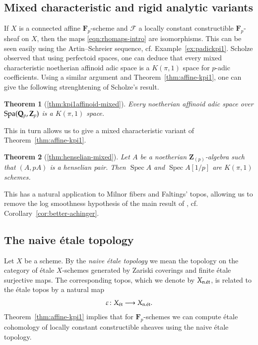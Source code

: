 \documentclass[twoside]{amsart}
\newcommand{\FF}{\mathbf{F}}
\newcommand{\QQ}{\mathbf{Q}}
\newcommand{\ZZ}{\mathbf{Z}}
\newcommand{\Ff}{\mathscr{F}}
\newcommand{\et}{{\rm\acute{e}t}}
\DeclareMathOperator{\Spec}{Spec}
\renewcommand{\to}{\longrightarrow}
\theoremstyle{plain}
\newtheorem*{theorem*}{Theorem}
\theoremstyle{definition}
\theoremstyle{remark}
\numberwithin{equation}{subsection}
\begin{document}
\subsection{Mixed characteristic and rigid analytic variants}

If $X$ is a connected affine $\FF_p$-scheme and $\Ff$ a locally constant constructible $\FF_p$-sheaf on $X$, then the maps \eqref{eqn:rhomaps-intro} are isomorphisms. This can be seen easily using the Artin--Schreier sequence, cf. Example~\ref{ex:padickpi1}. Scholze \cite[Theorem~4.9]{ScholzePAdic} observed that using perfectoid spaces, one can deduce that every mixed characteristic noetherian affinoid adic space is a $K(\pi, 1)$ space for $p$-adic coefficients. Using a similar argument and Theorem~\ref{thm:affine-kpi1}, one can give the following strenghtening of Scholze's result.

\begin{theorem*}[\ref{thm:kpi1affinoid-mixed}]
	Every noetherian affinoid adic space over ${\rm Spa}(\QQ_p, \ZZ_p)$ is a $K(\pi, 1)$ space. 
\end{theorem*}

This in turn allows us to give a mixed characteristic variant of Theorem~\ref{thm:affine-kpi1}.

\begin{theorem*}[\ref{thm:henselian-mixed}]
	Let $A$ be a noetherian $\ZZ_{(p)}$-algebra such that $(A, pA)$ is a henselian pair. Then $\Spec A$ and $\Spec A[1/p]$ are $K(\pi, 1)$ schemes.
\end{theorem*}

This has a natural application to Milnor fibers and Faltings' topos, allowing us to remove the log smoothness hypothesis of the main result of \cite{Achinger}, cf. Corollary~\ref{cor:better-achinger}.

\subsection{The naive \'etale topology}

Let $X$ be a scheme. By the \emph{naive \'etale topology} we mean the topology on the category of \'etale $X$-schemes generated by Zariski coverings and finite \'etale surjective maps. The corresponding topos, which we denote by $X_{{\rm n.}\et}$, is related to the \'etale topos by a natural map
\[ 
	\varepsilon \colon X_\et \to X_{{\rm n.}\et}.
\]
Theorem~\ref{thm:affine-kpi1} implies that for $\FF_p$-schemes we can compute \'etale cohomology of locally constant constructible sheaves using the naive \'etale topology.
\end{document}
